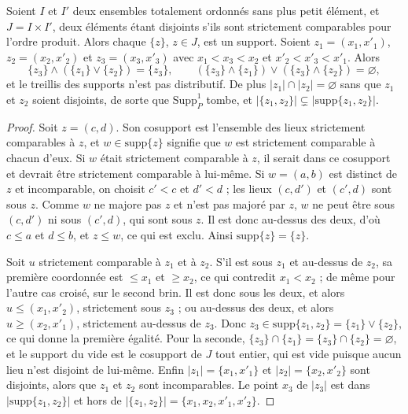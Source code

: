 \begin{encadre}
\begin{theoreme}
Soient $I$ et $I'$ deux ensembles totalement ordonnés sans plus petit élément, et $J = I \times I'$, deux éléments étant disjoints s'ils sont strictement comparables pour l'ordre produit. Alors chaque $\{z\}$, $z \in J$, est un support. Soient $z_1 = (x_1, x'_1)$, $z_2 = (x_2, x'_2)$ et $z_3 = (x_3, x'_3)$ avec $x_1 < x_3 < x_2$ et $x'_2 < x'_3 < x'_1$. Alors
\[
\{z_3\} \wedge (\{z_1\} \vee \{z_2\}) = \{z_3\} , \qquad (\{z_3\} \wedge \{z_1\}) \vee (\{z_3\} \wedge \{z_2\}) = \varnothing ,
\]
et le treillis des supports n'est pas distributif. De plus $|z_1| \cap |z_2| = \varnothing$ sans que $z_1$ et $z_2$ soient disjoints, de sorte que $\mathrm{Supp}^1_P$ tombe, et $|\{z_1, z_2\}| \subsetneq |\mathrm{supp}\{z_1, z_2\}|$.
\end{theoreme}
\end{encadre}

\begin{proof}
Soit $z = (c, d)$. Son cosupport est l'ensemble des lieux strictement comparables à $z$, et $w \in \mathrm{supp}\{z\}$ signifie que $w$ est strictement comparable à chacun d'eux. Si $w$ était strictement comparable à $z$, il serait dans ce cosupport et devrait être strictement comparable à lui-même. Si $w = (a, b)$ est distinct de $z$ et incomparable, on choisit $c' < c$ et $d' < d$ ; les lieux $(c, d')$ et $(c', d)$ sont sous $z$. Comme $w$ ne majore pas $z$ et n'est pas majoré par $z$, $w$ ne peut être sous $(c, d')$ ni sous $(c', d)$, qui sont sous $z$. Il est donc au-dessus des deux, d'où $c \leq a$ et $d \leq b$, et $z \leq w$, ce qui est exclu. Ainsi $\mathrm{supp}\{z\} = \{z\}$.

Soit $u$ strictement comparable à $z_1$ et à $z_2$. S'il est sous $z_1$ et au-dessus de $z_2$, sa première coordonnée est $\leq x_1$ et $\geq x_2$, ce qui contredit $x_1 < x_2$ ; de même pour l'autre cas croisé, sur le second brin. Il est donc sous les deux, et alors $u \leq (x_1, x'_2)$, strictement sous $z_3$ ; ou au-dessus des deux, et alors $u \geq (x_2, x'_1)$, strictement au-dessus de $z_3$. Donc $z_3 \in \mathrm{supp}\{z_1, z_2\} = \{z_1\} \vee \{z_2\}$, ce qui donne la première égalité. Pour la seconde, $\{z_3\} \cap \{z_1\} = \{z_3\} \cap \{z_2\} = \varnothing$, et le support du vide est le cosupport de $J$ tout entier, qui est vide puisque aucun lieu n'est disjoint de lui-même. Enfin $|z_1| = \{x_1, x'_1\}$ et $|z_2| = \{x_2, x'_2\}$ sont disjoints, alors que $z_1$ et $z_2$ sont incomparables. Le point $x_3$ de $|z_3|$ est dans $|\mathrm{supp}\{z_1, z_2\}|$ et hors de $|\{z_1, z_2\}| = \{x_1, x_2, x'_1, x'_2\}$.
\end{proof}

